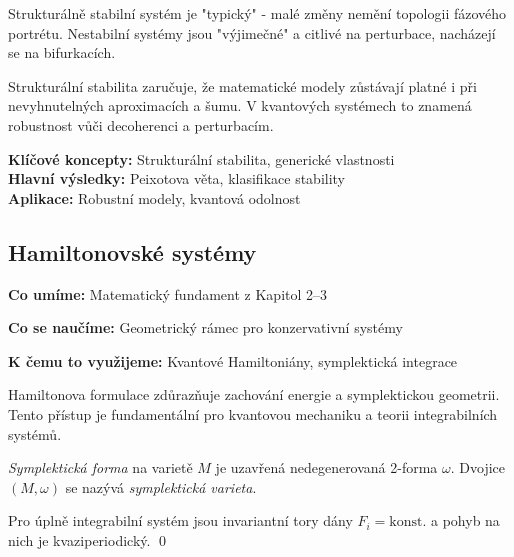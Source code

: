 \begin{intuition}
Strukturálně stabilní systém je "typický" - malé změny nemění topologii fázového portrétu. Nestabilní systémy jsou "výjimečné" a citlivé na perturbace, nacházejí se na bifurkacích.
\end{intuition}

\begin{keyinsight}
Strukturální stabilita zaručuje, že matematické modely zůstávají platné i při nevyhnutelných aproximacích a šumu. V kvantových systémech to znamená robustnost vůči decoherenci a perturbacím.
\end{keyinsight}

\begin{summary}
\textbf{Klíčové koncepty:} Strukturální stabilita, generické vlastnosti \\
\textbf{Hlavní výsledky:} Peixotova věta, klasifikace stability \\
\textbf{Aplikace:} Robustní modely, kvantová odolnost
\end{summary}

\spc

\subsection{Hamiltonovské systémy}

\begin{scaffold}
\item[] \textbf{Co umíme:} Matematický fundament z Kapitol 2–3
\item[] \textbf{Co se naučíme:} Geometrický rámec pro konzervativní systémy  
\item[] \textbf{K čemu to využijeme:} Kvantové Hamiltoniány, symplektická integrace
\end{scaffold}

\begin{motivation}
Hamiltonova formulace zdůrazňuje zachování energie a symplektickou geometrii. Tento přístup je fundamentální pro kvantovou mechaniku a teorii integrabilních systémů.
\end{motivation}

\begin{definition}
\emph{Symplektická forma} na varietě $M$ je uzavřená nedegenerovaná 2-forma $\omega$. Dvojice $(M,\omega)$ se nazývá \emph{symplektická varieta}.
\end{definition}

\begin{theorem}
Pro úplně integrabilní systém jsou invariantní tory dány $F_i = \text{konst.}$ a pohyb na nich je kvaziperiodický.
\qed
\end{theorem}

